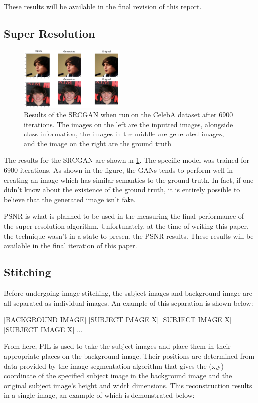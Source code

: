 These results will be available in the final revision of this report.

\subsection{Super Resolution}

\begin{figure}
	\centering
	\includegraphics[width=0.45\textwidth]{images/gan-res.png}
	\caption{Results of the SRCGAN when run on the CelebA dataset after 6900
	iterations. The images on the left are the inputted images, alongside class
	information, the images in the middle are generated images, and the image on
	the right are the ground truth}
	\label{fig:gan-res}
\end{figure}

The results for the SRCGAN are shown in \ref{fig:gan-res}. The specific model was
trained for 6900 iterations. As shown in the figure, the GANs tends to perform
well in creating an image which has similar semantics to the ground truth. In
fact, if one didn’t know about the existence of the ground truth, it is entirely
possible to believe that the generated image isn’t fake.

PSNR is what is planned to be used in the measuring the final performance of the
super-resolution algorithm. Unfortunately, at the time of writing this paper,
the technique wasn’t in a state to present the PSNR results. These results will
be available in the final iteration of this paper.

\subsection{Stitching}
Before undergoing image stitching, the subject images and background image are
all separated as individual images. An example of this separation is shown
below:

[BACKGROUND IMAGE]
[SUBJECT IMAGE X] [SUBJECT IMAGE X] [SUBJECT IMAGE X] ...

From here, PIL is used to take the subject images and place them in their
appropriate places on the background image. Their positions are determined from
data provided by the image segmentation algorithm that gives the (x,y)
coordinate of the specified subject image in the background image and the
original subject image’s height and width dimensions. This reconstruction
results in a single image, an example of which is demonstrated below:

